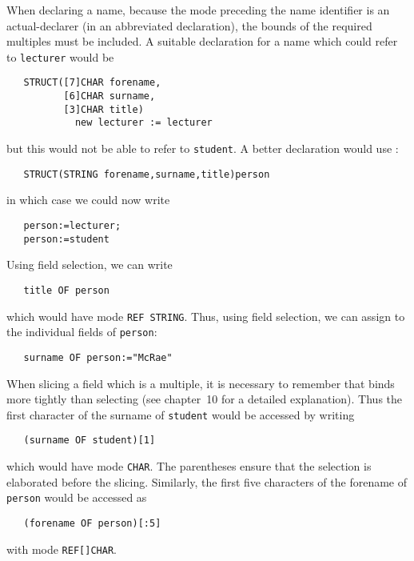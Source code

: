 When declaring a name, because the mode preceding the name identifier
is an actual-declarer (in an abbreviated declaration), the bounds of
the required multiples must be included. A suitable declaration for a
name which could refer to \verb|lecturer| would be
\begin{verbatim}
   STRUCT([7]CHAR forename,
          [6]CHAR surname,
          [3]CHAR title)
            new lecturer := lecturer
\end{verbatim}
\noindent
but this would not be able to refer to \verb|student|. A better
declaration would use :
\begin{verbatim}
   STRUCT(STRING forename,surname,title)person
\end{verbatim}
\noindent
in which case we could now write
\begin{verbatim}
   person:=lecturer;
   person:=student
\end{verbatim}
\noindent
Using field selection, we can write
\begin{verbatim}
   title OF person
\end{verbatim}
\noindent
which would have mode \verb|REF STRING|. Thus, using field selection,
we can assign to the individual fields of \verb|person|:
\begin{verbatim}
   surname OF person:="McRae"
\end{verbatim}

When slicing a field which is a multiple, it is necessary to remember
that  binds more tightly than selecting (see
chapter~10 for a detailed explanation). Thus the first character of
the surname of \verb|student| would be accessed by writing
\begin{verbatim}
   (surname OF student)[1]
\end{verbatim}
\noindent
which would have mode \verb|CHAR|. The parentheses ensure that the
selection is elaborated before the slicing. Similarly, the first five
characters of the forename of \verb|person| would be accessed as
\begin{verbatim}
   (forename OF person)[:5]
\end{verbatim}
\noindent
with mode \verb|REF[]CHAR|.

